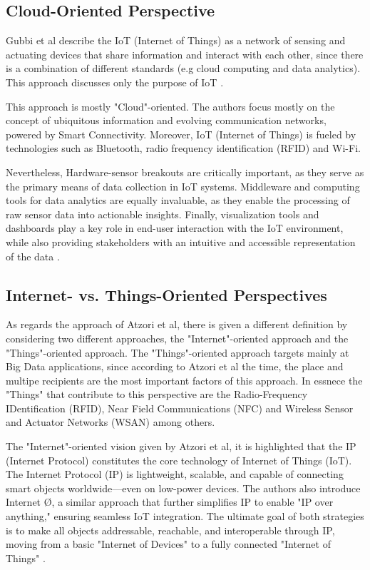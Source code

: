 {{	\subsection{Cloud-Oriented Perspective}
	{
		
		Gubbi et al describe the IoT (Internet of Things) as a network of sensing and actuating devices that share information and interact with each other, since there is a combination of different standards (e.g cloud computing and data analytics). This approach discusses only the purpose of IoT \cite{Gubbi2013}.
		
		This approach is mostly "Cloud"-oriented. The authors focus mostly on the concept of ubiquitous information and evolving communication networks, powered by Smart Connectivity. Moreover, IoT (Internet of Things) is fueled by technologies such as Bluetooth, radio frequency identification (RFID) and Wi-Fi\cite{Gubbi2013}.
		
		Nevertheless, Hardware-sensor breakouts are critically important, as they serve as the primary means of data collection in IoT systems. Middleware and computing tools for data analytics are equally invaluable, as they enable the processing of raw sensor data into actionable insights. Finally, visualization tools and dashboards play a key role in end-user interaction with the IoT environment, while also providing stakeholders with an intuitive and accessible representation of the data \cite{Gubbi2013}.
	}
	
	\subsection{Internet- vs. Things-Oriented Perspectives}
	{
		As regards the approach of Atzori et al, there is given a different definition by considering two different approaches, the "Internet"-oriented approach and the "Things"-oriented approach. The "Things"-oriented approach targets mainly at Big Data applications, since according to Atzori et al the time, the place and multipe recipients are the most important factors of this approach. In essnece the "Things" that contribute to this perspective are the Radio-Frequency IDentification (RFID), Near Field Communications (NFC) and Wireless Sensor and Actuator Networks (WSAN) among others.
		
		The "Internet"-oriented vision given by Atzori et al, it is highlighted that the IP (Internet Protocol) constitutes the core technology of Internet of Things (IoT). The Internet Protocol (IP) is lightweight, scalable, and capable of connecting smart objects worldwide—even on low-power devices. The authors also introduce Internet Ø, a similar approach that further simplifies IP to enable "IP over anything," ensuring seamless IoT integration. The ultimate goal of both strategies is to make all objects addressable, reachable, and interoperable through IP, moving from a basic "Internet of Devices" to a fully connected "Internet of Things" \cite{Atzori2010}. 
	}
	
}}
